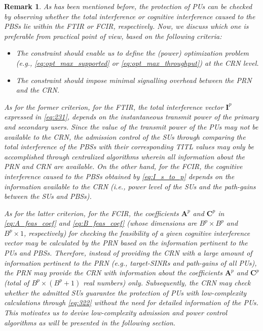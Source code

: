 \documentclass[journal,twoside]{IEEEtran}
\newtheorem {remark}{Remark}
\begin{document}
	\begin{remark}
		\label{rmk:1}
		As has been mentioned before, the protection of PUs can be checked by observing whether the total interference or cognitive interference caused to the PBSs lie within the FTIR or FCIR, respectively. Now, we discuss which one is  preferable from practical point of view, based on the following criteria:

		\begin{itemize}
			\item The constraint should enable us to define the (power) optimization problem (e.g., \eqref{eq:opt_max_supported} or \eqref{eq:opt_max_throughput}) at the CRN level.
			\item The constraint should impose minimal signalling overhead between the PRN and the CRN.
			
		\end{itemize}
		
		As for the former criterion, for the FTIR, the total interference vector $\mathbf{I}^p$ expressed in \eqref{eq:231}, depends on the instantaneous transmit power of the primary and secondary users. Since the value of the transmit power of the PUs may not be available to the CRN, the admission control of the SUs through comparing the total interference of the PBSs with their corresponding TITL values may only be accomplished through centralized algorithms wherein all information about the PRN and CRN are available. On the other hand, for the FCIR, the cognitive interference caused to the PBSs obtained by \eqref{eq:I_s_to_p} depends on the information available to the CRN (i.e., power level of the SUs and the path-gains between the SUs and PBSs).
		 
		As for the latter criterion, for the FCIR, the coefficients $\mathbf{A}^p$ and $\mathbf{C}^p$ in \eqref{eq:A_feas_coef} and \eqref{eq:B_feas_coef} (whose dimensions are $B^p\times B^p$ and $B^p \times 1$, respectively) for checking the feasibility of a given cognitive interference vector may be calculated by the PRN based on the information pertinent to the PUs and PBSs. Therefore, instead of providing the CRN with a large amount of information pertinent to the PRN (e.g., target-SINRs and path-gains of all PUs), the PRN may provide the CRN with information about the coefficients $\mathbf{A}^p$ and $\mathbf{C}^p$ (total of $B^p \times (B^p+1)$ real numbers) only. Subsequently, the CRN may check whether the admitted SUs guarantee the protection of PUs with low-complexity calculations through \eqref{eq:322}  without the need for detailed information of the PUs. This motivates us to devise low-complexity admission and power control algorithms as will be presented in the following section.
	\end{remark}
\end{document}

